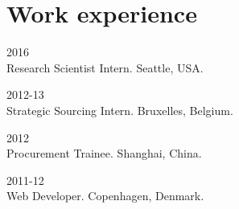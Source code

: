 \section*{Work experience}

\begin{paracol}{2}
  \textsc{2016}
\switchcolumn
  \\
  Research Scientist Intern. Seattle, USA.
\end{paracol}

\begin{paracol}{2}
  \textsc{2012-13}
\switchcolumn
  \\
  Strategic Sourcing Intern. Bruxelles, Belgium.
\end{paracol}

\begin{paracol}{2}
  \textsc{2012}
\switchcolumn
  \\
  Procurement Trainee. Shanghai, China.
\end{paracol}

\begin{paracol}{2}
  \textsc{2011-12}
\switchcolumn
  \\
  Web Developer. Copenhagen, Denmark.
\end{paracol}